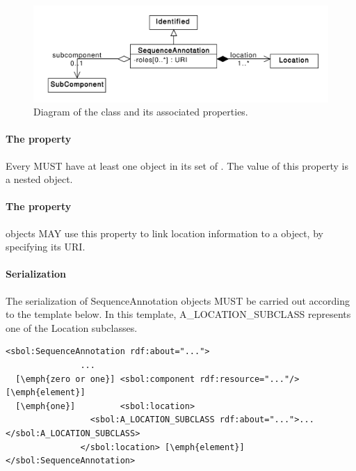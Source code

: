 \begin{figure}[ht]
\begin{center}
\includegraphics[scale=0.6]{uml/sequence_annotation}
\caption[]{Diagram of the  class and its associated properties.}
\label{uml:sequence_annotation}
\end{center}
\end{figure}

\paragraph{The  property}\label{sec:locations}
\label{sec:locations}
Every  MUST have at least one  object in its set of . The value of this property is a nested  object.


\paragraph{The  property}\label{sec:component}
 objects MAY use this property to link location information to a  object, by specifying its URI.


\paragraph{Serialization}

The serialization of SequenceAnnotation objects MUST be carried out according to the template below. In this template, A\_LOCATION\_SUBCLASS represents one of the Location subclasses.
\begin{lstlisting}
<sbol:SequenceAnnotation rdf:about="...">
               ...   
  [\emph{zero or one}] <sbol:component rdf:resource="..."/> [\emph{element}] 
  [\emph{one}]         <sbol:location>
                 <sbol:A_LOCATION_SUBCLASS rdf:about="...">...</sbol:A_LOCATION_SUBCLASS>
               </sbol:location> [\emph{element}] 
</sbol:SequenceAnnotation>
\end{lstlisting}

